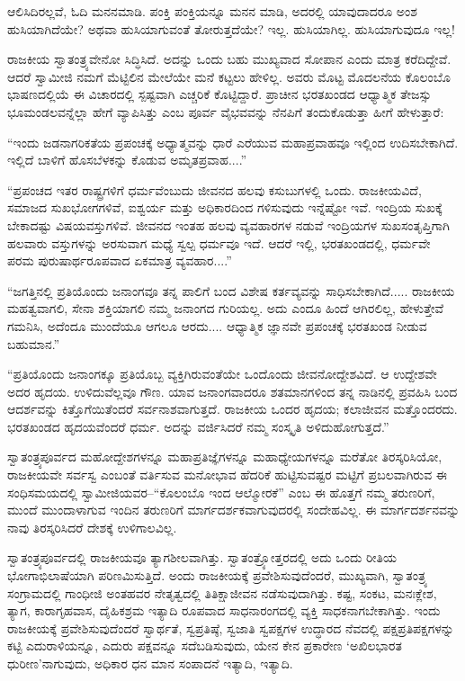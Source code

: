 ಆಲಿಸಿದಿರಲ್ಲವೆ, ಓದಿ ಮನನಮಾಡಿ. ಪಂಕ್ತಿ ಪಂಕ್ತಿಯನ್ನೂ ಮನನ ಮಾಡಿ, ಅದರಲ್ಲಿ ಯಾವುದಾದರೂ ಅಂಶ ಹುಸಿಯಾಗಿದೆಯೇ? ಅಥವಾ ಹುಸಿಯಾಗುವಂತೆ ತೋರುತ್ತದೆಯೇ? ಇಲ್ಲ. ಹುಸಿಯಾಗಿಲ್ಲ. ಹುಸಿಯಾಗುವುದೂ ಇಲ್ಲ!

ರಾಜಕೀಯ ಸ್ವಾತಂತ್ರ್ಯವೇನೋ ಸಿದ್ಧಿಸಿದೆ. ಅದನ್ನು ಒಂದು ಬಹು ಮುಖ್ಯವಾದ ಸೋಪಾನ ಎಂದು ಮಾತ್ರ ಕರೆದಿದ್ದೇವೆ. ಆದರೆ ಸ್ವಾಮೀಜಿ ನಮಗೆ ಮೆಟ್ಟಿಲಿನ ಮೇಲೆಯೇ ಮನೆ ಕಟ್ಟಲು ಹೇಳಿಲ್ಲ. ಅವರು ಮೊಟ್ಟ ಮೊದಲನೆಯ ಕೊಲಂಬೊ ಭಾಷಣದಲ್ಲಿಯೆ ಈ ವಿಚಾರದಲ್ಲಿ ಸ್ಪಷ್ಟವಾಗಿ ಎಚ್ಚರಿಕೆ ಕೊಟ್ಟಿದ್ದಾರೆ. ಪ್ರಾಚೀನ ಭರತಖಂಡದ ಆಧ್ಯಾತ್ಮಿಕ ತೇಜಸ್ಸು ಭೂಮಂಡಲವನ್ನೆಲ್ಲಾ ಹೇಗೆ ವ್ಯಾಪಿಸಿತ್ತು ಎಂಬ ಪೂರ್ವ ವೈಭವವನ್ನು ನೆನಪಿಗೆ ತಂದುಕೊಡುತ್ತಾ ಹೀಗೆ ಹೇಳುತ್ತಾರೆ:

“ಇಂದು ಜಡನಾಗರಿಕತೆಯ ಪ್ರಪಂಚಕ್ಕೆ ಅಧ್ಯಾತ್ಮವನ್ನು ಧಾರೆ ಎರೆಯುವ ಮಹಾಪ್ರವಾಹವೂ ಇಲ್ಲಿಂದ ಉದಿಸಬೇಕಾಗಿದೆ. ಇಲ್ಲಿದೆ ಬಾಳಿಗೆ ಹೊಸಬೆಳಕನ್ನು ಕೊಡುವ ಅಮೃತಪ್ರವಾಹ....”

“ಪ್ರಪಂಚದ ಇತರ ರಾಷ್ಟ್ರಗಳಿಗೆ ಧರ್ಮವೆಂಬುದು ಜೀವನದ ಹಲವು ಕಸುಬುಗಳಲ್ಲಿ ಒಂದು. ರಾಜಕೀಯವಿದೆ, ಸಮಾಜದ ಸುಖಭೋಗಗಳಿವೆ, ಐಶ್ವರ್ಯ ಮತ್ತು ಅಧಿಕಾರದಿಂದ ಗಳಿಸುವುದು ಇನ್ನೆಷ್ಟೋ ಇವೆ. ಇಂದ್ರಿಯ ಸುಖಕ್ಕೆ ಬೇಕಾದಷ್ಟು ವಿಷಯವಸ್ತುಗಳಿವೆ. ಜೀವನದ ಇಂತಹ ಹಲವು ವ್ಯವಹಾರಗಳ ನಡುವೆ ಇಂದ್ರಿಯಗಳ ಸುಖಸಂತೃಪ್ತಿಗಾಗಿ ಹಲವಾರು ವಸ್ತುಗಳನ್ನು ಅರಸುವಾಗ ಮಧ್ಯೆ ಸ್ವಲ್ಪ ಧರ್ಮವೂ ಇದೆ. ಆದರೆ ಇಲ್ಲಿ, ಭರತಖಂಡದಲ್ಲಿ, ಧರ್ಮವೇ ಪರಮ ಪುರುಷಾರ್ಥರೂಪವಾದ ಏಕಮಾತ್ರ ವ್ಯವಹಾರ....”

“ಜಗತ್ತಿನಲ್ಲಿ ಪ್ರತಿಯೊಂದು ಜನಾಂಗವೂ ತನ್ನ ಪಾಲಿಗೆ ಬಂದ ವಿಶೇಷ ಕರ್ತವ್ಯವನ್ನು ಸಾಧಿಸಬೇಕಾಗಿದೆ..... ರಾಜಕೀಯ ಮಹತ್ವವಾಗಲಿ, ಸೇನಾ ಶಕ್ತಿಯಾಗಲಿ ನಮ್ಮ ಜನಾಂಗದ ಗುರಿಯಲ್ಲ. ಅದು ಎಂದೂ ಹಿಂದೆ ಆಗಿರಲಿಲ್ಲ, ಹೇಳುತ್ತೇವೆ ಗಮನಿಸಿ, ಅದೆಂದೂ ಮುಂದೆಯೂ ಆಗಲೂ ಆರದು.... ಆಧ್ಯಾತ್ಮಿಕ ಜ್ಞಾನವೇ ಪ್ರಪಂಚಕ್ಕೆ ಭರತಖಂಡ ನೀಡುವ ಬಹುಮಾನ.”

“ಪ್ರತಿಯೊಂದು ಜನಾಂಗಕ್ಕೂ ಪ್ರತಿಯೊಬ್ಬ ವ್ಯಕ್ತಿಗಿರುವಂತೆಯೇ ಒಂದೊಂದು ಜೀವನೋದ್ದೇಶವಿದೆ. ಆ ಉದ್ದೇಶವೇ ಅದರ ಹೃದಯ. ಉಳಿದುವೆಲ್ಲವೂ ಗೌಣ. ಯಾವ ಜನಾಂಗವಾದರೂ ಶತಮಾನಗಳಿಂದ ತನ್ನ ನಾಡಿನಲ್ಲಿ ಪ್ರವಹಿಸಿ ಬಂದ ಆದರ್ಶವನ್ನು ಕಿತ್ತೊಗೆಯಿತೆಂದರೆ ಸರ್ವನಾಶವಾಗುತ್ತದೆ. ರಾಜಕೀಯ ಒಂದರ ಹೃದಯ; ಕಲಾಜೀವನ ಮತ್ತೊಂದರದು. ಭರತಖಂಡದ ಹೃದಯವೆಂದರೆ ಧರ್ಮ. ಅದನ್ನು ವರ್ಜಿಸಿದರೆ ನಮ್ಮ ಸಂಸ್ಕೃತಿ ಅಳಿದುಹೋಗುತ್ತದೆ.”

ಸ್ವಾತಂತ್ರ್ಯಪೂರ್ವದ ಮಹೋದ್ದೇಶಗಳನ್ನೂ ಮಹಾಪ್ರತಿಜ್ಞೆಗಳನ್ನೂ ಮಹಾಧ್ಯೇಯಗಳನ್ನೂ ಮರೆತೋ ತಿರಸ್ಕರಿಸಿಯೋ, ರಾಜಕೀಯವೇ ಸರ್ವಸ್ವ ಎಂಬಂತೆ ವರ್ತಿಸುವ ಮನೋಭಾವ ಹೆದರಿಕೆ ಹುಟ್ಟಿಸುವಷ್ಟರ ಮಟ್ಟಿಗೆ ಪ್ರಬಲವಾಗಿರುವ ಈ ಸಂಧಿಸಮಯದಲ್ಲಿ ಸ್ವಾಮೀಜಿಯವರ–“ಕೊಲಂಬೊ ಇಂದ ಆಲ್ಮೋರಕೆ” ಎಂಬ ಈ ಹೊತ್ತಗೆ ನಮ್ಮ ತರುಣರಿಗೆ, ಮುಂದೆ ಮುಂದಾಳಾಗುವ ಇಂದಿನ ತರುಣರಿಗೆ ಮಾರ್ಗದರ್ಶಕವಾಗುವುದರಲ್ಲಿ ಸಂದೇಹವಿಲ್ಲ. ಈ ಮಾರ್ಗದರ್ಶನವನ್ನು ನಾವು ತಿರಸ್ಕರಿಸಿದರೆ ದೇಶಕ್ಕೆ ಉಳಿಗಾಲವಿಲ್ಲ. 

ಸ್ವಾತಂತ್ರ್ಯಪೂರ್ವದಲ್ಲಿ ರಾಜಕೀಯವೂ ತ್ಯಾಗಶೀಲವಾಗಿತ್ತು. ಸ್ವಾತಂತ್ರ್ಯೋತ್ತರದಲ್ಲಿ ಅದು ಒಂದು ರೀತಿಯ ಭೋಗಾಭಿಲಾಷೆಯಾಗಿ ಪರಿಣಮಿಸುತ್ತಿದೆ. ಅಂದು ರಾಜಕೀಯಕ್ಕೆ ಪ್ರವೇಶಿಸುವುದೆಂದರೆ, ಮುಖ್ಯವಾಗಿ, ಸ್ವಾತಂತ್ರ್ಯ ಸಂಗ್ರಾಮದಲ್ಲಿ ಗಾಂಧೀಜಿ ಅಂತಹವರ ನೇತೃತ್ವದಲ್ಲಿ ತಿತಿಕ್ಷಾಜೀವನ ನಡೆಸುವುದಾಗಿತ್ತು. ಕಷ್ಟ, ಸಂಕಟ, ಮನಃಕ್ಲೇಶ, ತ್ಯಾಗ, ಕಾರಾಗೃಹವಾಸ, ದೈಹಿಕಶ್ರಮ ಇತ್ಯಾದಿ ರೂಪವಾದ ಸಾಧನಾರಂಗದಲ್ಲಿ ವ್ಯಕ್ತಿ ಸಾಧಕನಾಗಬೇಕಾಗಿತ್ತು. ಇಂದು ರಾಜಕೀಯಕ್ಕೆ ಪ್ರವೇಶಿಸುವುದೆಂದರೆ ಸ್ವಾರ್ಥತೆ, ಸ್ವಪ್ರತಿಷ್ಠೆ, ಸ್ವಜಾತಿ ಸ್ವಪಕ್ಷಗಳ ಉದ್ಧಾರದ ನೆವದಲ್ಲಿ ಪಕ್ಷಪ್ರತಿಪಕ್ಷಗಳನ್ನು ಕಟ್ಟಿ ಎದುರಾಳಿಯನ್ನೂ, ಎದುರು ಪಕ್ಷವನ್ನೂ ಸದೆಬಡಿಸುವುದು, ಯೇನ ಕೇನ ಪ್ರಕಾರೇಣ ‘ಅಖಿಲಭಾರತ ಧುರೀಣ’ನಾಗುವುದು, ಅಧಿಕಾರ ಧನ ಮಾನ ಸಂಪಾದನೆ ಇತ್ಯಾದಿ, ಇತ್ಯಾದಿ. 

